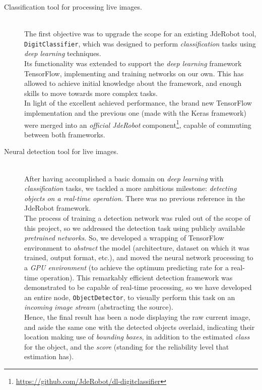 	\begin{description}
		\item[Classification tool for processing live images.] \hfill
			\vspace{0.2in} \\
			The first objective was to upgrade the scope for an existing JdeRobot tool, \texttt{DigitClassifier}, which was designed to perform \emph{classification} tasks using \emph{deep learning} techniques.\\
			
			Its functionality was extended to support the \emph{deep learning} framework TensorFlow, implementing and training networks on our own. This has allowed to achieve initial knowledge about the framework, and enough skills to move towards more complex tasks.\\
			
			In light of the excellent achieved performance, the brand new TensorFlow implementation and the previous one (made with the Keras framework) were merged into an \emph{official JdeRobot} component\footnote{\url{https://github.com/JdeRobot/dl-digitclassifier}}, capable of commuting between both frameworks.
		
		\item[Neural detection tool for live images.] \hfill
			\vspace{0.2in} \\		
			After having accomplished a basic domain on \emph{deep learning} with \emph{classification} tasks, we tackled a more ambitious milestone: \emph{detecting objects on a real-time operation}. There was no previous reference in the JdeRobot framework.\\
			
			The process of training a detection network was ruled out of the scope of this project, so we addressed the detection task using publicly available \emph{pretrained networks}. So, we developed a wrapping of TensorFlow environment to \emph{abstract} the model (architecture, dataset on which it was trained, output format, etc.), and moved the neural network processing to a \emph{GPU environment} (to achieve the optimum predicting rate for a real-time operation). This remarkably efficient detection framework was demonstrated to be capable of real-time processing, so we have developed an entire node, \texttt{ObjectDetector}, to visually perform this task on an \emph{incoming image stream} (abstracting the source).\\
			
			Hence, the final result  has been a node displaying the raw current image, and aside the same one with the detected objects overlaid, indicating their location making use of \emph{bounding boxes}, in addition to the estimated \emph{class} for the object, and the \emph{score} (standing for the reliability level that estimation has).\\
			

\end{description}
